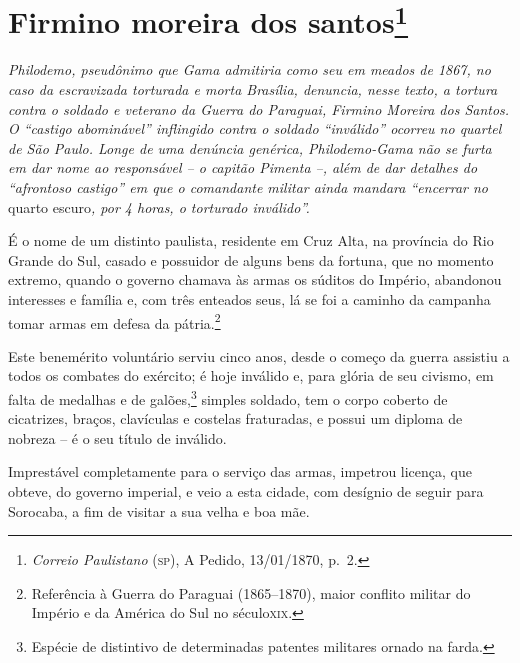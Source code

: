 \chapter{Firmino moreira dos santos\footnote{\emph{Correio Paulistano} (\textsc{sp}), A Pedido, 13/01/1870,
  p.~2.}} %

\begin{didascalia}
\emph{Philodemo, pseudônimo que Gama admitiria como seu em meados de
1867, no caso da escravizada torturada e morta Brasília, denuncia, nesse
texto, a tortura contra o soldado e veterano da Guerra do Paraguai,
Firmino Moreira dos Santos. O ``castigo abominável'' inflingido contra o
soldado ``inválido'' ocorreu no quartel de São Paulo. Longe de uma
denúncia genérica, Philodemo-Gama não se furta em dar nome ao
responsável -- o capitão Pimenta --, além de dar detalhes do ``afrontoso
castigo'' em que o comandante militar ainda mandara ``encerrar no} quarto
escuro\emph{, por 4 horas, o torturado inválido''.}
\end{didascalia}


É o nome de um distinto paulista, residente em Cruz Alta, na província
do Rio Grande do Sul, casado e possuidor de alguns bens da fortuna, que
no momento extremo, quando o governo chamava às armas os súditos do
Império, abandonou interesses e família e, com três enteados seus, lá se
foi a caminho da campanha tomar armas em defesa da pátria.\footnote{
  Referência à Guerra do Paraguai (1865--1870), maior conflito militar do
  Império e da América do Sul no século\textsc{xix}.}

Este benemérito voluntário serviu cinco anos, desde o começo da guerra
assistiu a todos os combates do exército; é hoje inválido e, para glória
de seu civismo, em falta de medalhas e de galões,\footnote{ Espécie
  de distintivo de determinadas patentes militares ornado na farda.}
simples soldado, tem o corpo coberto de cicatrizes, braços, clavículas e
costelas fraturadas, e possui um diploma de nobreza -- é o seu título de
inválido.

Imprestável completamente para o serviço das armas, impetrou licença,
que obteve, do governo imperial, e veio a esta cidade, com desígnio de
seguir para Sorocaba, a fim de visitar a sua velha e boa mãe.

